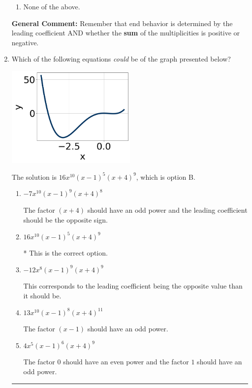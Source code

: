 \documentclass{extbook}[14pt]
\newcommand{\litem}[1]{\item #1

\rule{\textwidth}{0.4pt}}
\begin{document}
\begin{enumerate}
{\begin{enumerate}[label=\Alph*.]
\begin{multicols}{2}
\end{multicols}\item None of the above.\end{enumerate}
\textbf{General Comment:} Remember that end behavior is determined by the leading coefficient AND whether the \textbf{sum} of the multiplicities is positive or negative.
}
\litem{
Which of the following equations \textit{could} be of the graph presented below?

\begin{center}
    \includegraphics[width=0.5\textwidth]{../Figures/polyGraphToFunctionCopyB.png}
\end{center}


The solution is \( 16x^{10} (x - 1)^{5} (x + 4)^{9} \), which is option B.\begin{enumerate}[label=\Alph*.]
\item \( -7x^{10} (x - 1)^{9} (x + 4)^{8} \)

The factor $(x + 4)$ should have an odd power and the leading coefficient should be the opposite sign.
\item \( 16x^{10} (x - 1)^{5} (x + 4)^{9} \)

* This is the correct option.
\item \( -12x^{8} (x - 1)^{9} (x + 4)^{9} \)

This corresponds to the leading coefficient being the opposite value than it should be.
\item \( 13x^{10} (x - 1)^{8} (x + 4)^{11} \)

The factor $(x - 1)$ should have an odd power.
\item \( 4x^{5} (x - 1)^{6} (x + 4)^{9} \)

The factor $0$ should have an even power and the factor $1$ should have an odd power.
\end{enumerate}

}
\end{enumerate}
\end{document}

